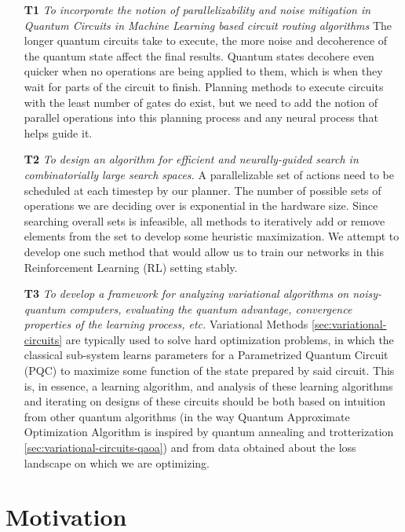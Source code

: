 \begin{enumerate}\label{enum:problems-addressed-by-thesis}
    \item[\textbf{T1}] \textit{To incorporate the notion of parallelizability and noise mitigation in Quantum Circuits in Machine Learning based circuit routing algorithms}
    The longer quantum circuits take to execute, the more noise and decoherence of the quantum state affect the final results. Quantum states decohere even quicker when no operations are being applied to them, which is when they wait for parts of the circuit to finish. Planning methods to execute circuits with the least number of gates do exist, but we need to add the notion of parallel operations into this planning process and any neural process that helps guide it.

    \item[\textbf{T2}] \textit{To design an algorithm for efficient and neurally-guided search in combinatorially large search spaces.}
    A parallelizable set of actions need to be scheduled at each timestep by our planner. The number of possible sets of operations we are deciding over is exponential in the hardware size. Since searching overall sets is infeasible, all methods to iteratively add or remove elements from the set to develop some heuristic maximization. We attempt to develop one such method that would allow us to train our networks in this Reinforcement Learning (RL) setting stably.

    \item[\textbf{T3}] \textit{To develop a framework for analyzing variational algorithms on noisy-quantum computers, evaluating the quantum advantage, convergence properties of the learning process, etc.}
    Variational Methods \ref{sec:variational-circuits} are typically used to solve hard optimization problems, in which the classical sub-system learns parameters for a Parametrized Quantum Circuit (PQC) to maximize some function of the state prepared by said circuit. This is, in essence, a learning algorithm, and analysis of these learning algorithms and iterating on designs of these circuits should be both based on intuition from other quantum algorithms (in the way Quantum Approximate Optimization Algorithm is inspired by quantum annealing and trotterization \ref{sec:variational-circuits-qaoa}) and from data obtained about the loss landscape on which we are optimizing.
\end{enumerate}

\section{Motivation}

